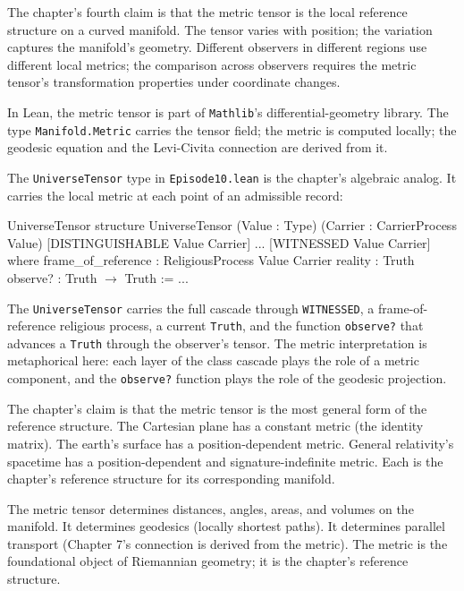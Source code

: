 The chapter's fourth claim is that the metric tensor is the local
reference structure on a curved manifold. The tensor varies with
position; the variation captures the manifold's geometry.
Different observers in different regions use different local
metrics; the comparison across observers requires the metric
tensor's transformation properties under coordinate changes.

In Lean, the metric tensor is part of \texttt{Mathlib}'s
differential-geometry library. The type
\texttt{Manifold.Metric} carries the tensor field; the metric
is computed locally; the geodesic equation and the Levi-Civita
connection are derived from it.

The \texttt{UniverseTensor} type in \texttt{Episode10.lean} is
the chapter's algebraic analog. It carries the local metric at
each point of an admissible record:

\begin{leanexcerpt}{UniverseTensor}
structure UniverseTensor
    (Value : Type)
    (Carrier : CarrierProcess Value)
    [DISTINGUISHABLE Value Carrier] ... [WITNESSED Value Carrier]
  where
  frame_of_reference : ReligiousProcess Value Carrier
  reality            : Truth
  observe?           : Truth $\to$ Truth := ...
\end{leanexcerpt}

The \texttt{UniverseTensor} carries the full cascade through
\texttt{WITNESSED}, a frame-of-reference religious process, a
current \texttt{Truth}, and the function \texttt{observe?} that
advances a \texttt{Truth} through the observer's tensor. The
metric interpretation is metaphorical here: each layer of the
class cascade plays the role of a metric component, and the
\texttt{observe?} function plays the role of the geodesic
projection.

The chapter's claim is that the metric tensor is the most general
form of the reference structure. The Cartesian plane has a
constant metric (the identity matrix). The earth's surface has a
position-dependent metric. General relativity's spacetime has a
position-dependent and signature-indefinite metric. Each is the
chapter's reference structure for its corresponding manifold.

The metric tensor determines distances, angles, areas, and
volumes on the manifold. It determines geodesics (locally
shortest paths). It determines parallel transport (Chapter 7's
connection is derived from the metric). The metric is the
foundational object of Riemannian geometry; it is the chapter's
reference structure.

